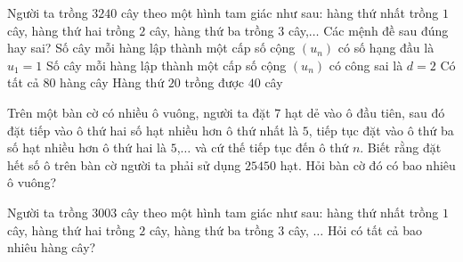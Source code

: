 \begin{ex}%
	Người ta trồng $3240$ cây theo một hình tam giác như sau: hàng thứ nhất trồng $1$ cây, hàng thứ hai trồng $2$ cây, hàng thứ ba trồng $3$ cây,$\ldots$ Các mệnh đề sau đúng hay sai?
	\choiceTF
	{\True Số cây mỗi hàng lập thành một cấp số cộng $(u_n)$ có số hạng đầu là $u_1=1$}
	{Số cây mỗi hàng lập thành một cấp số cộng $(u_n)$ có công sai là $d=2$}
	{\True Có tất cả $80$ hàng cây}
	{Hàng thứ $20$ trồng được $40$ cây}
\end{ex}

\begin{bt}%
	Trên một bàn cờ có nhiều ô vuông, người ta đặt $7$ hạt dẻ vào ô đầu tiên, sau đó đặt tiếp vào ô thứ hai số hạt nhiều hơn ô thứ nhất là $5$, tiếp tục đặt vào ô thứ ba số hạt nhiều hơn ô thứ hai là $5$,$\ldots$ và cứ thế tiếp tục đến ô thứ $n$. Biết rằng đặt hết số ô trên bàn cờ người ta phải sử dụng $25450$ hạt. Hỏi bàn cờ đó có bao nhiêu ô vuông?\par
\end{bt}

\begin{bt}%
	Người ta trồng $3003$ cây theo một hình tam giác như sau: hàng thứ nhất trồng $1$ cây, hàng thứ hai trồng $2$ cây, hàng thứ ba trồng $3$ cây, $\ldots$ Hỏi có tất cả bao nhiêu hàng cây?\par
\end{bt}

